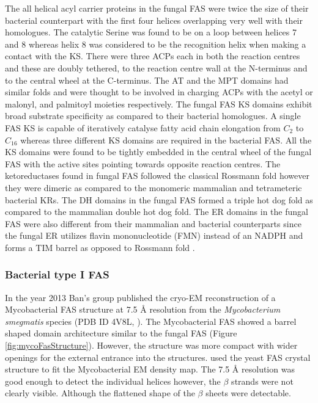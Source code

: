 		The all helical acyl carrier proteins in the fungal FAS were twice the size of their bacterial counterpart  with the first four helices overlapping very well with their homologues. The catalytic Serine was found to be on a loop between helices 7 and 8 whereas helix 8 was considered to be the recognition helix when making a contact with the KS. There were three ACPs each in both the reaction centres and these are doubly tethered, to the reaction centre wall at the N-terminus and to the central wheel at the C-terminus. The AT and the MPT domains had similar folds and were thought to be involved in charging ACPs with the acetyl or malonyl, and palmitoyl moieties respectively. The fungal FAS KS domains exhibit broad substrate specificity as compared to their bacterial homologues. A single FAS KS is capable of iteratively catalyse fatty acid chain elongation from $ C_{2} $ to $ C_{16} $ whereas three different KS domains are required in the bacterial FAS. All the KS domains were found to be tightly embedded in the central wheel of the fungal FAS with the active sites pointing towards opposite reaction centres. The ketoreductases found in fungal FAS followed the classical Rossmann fold however they were dimeric as compared to the monomeric mammalian and tetrameteric bacterial KRs. The DH domains in the fungal FAS formed a triple hot dog fold as compared to the mammalian double hot dog fold. The ER domains in the fungal FAS were also different from their mammalian and bacterial counterparts since the fungal ER utilizes flavin mononucleotide (FMN)  instead of an NADPH and forms a TIM barrel as opposed to Rossmann fold \parencite{Jenni2007, Leibundgut2007}.
		
		\subsubsection{Bacterial type I FAS}
		\label{sec:bFAS}
		In the year 2013 Ban's group published the cryo-EM reconstruction of a Mycobacterial FAS structure at 7.5 \AA{} resolution from the \textit{Mycobacterium smegmatis} species (PDB ID 4V8L, \textcite{Boehringer2013}). The Mycobacterial FAS showed a barrel shaped domain architecture similar to the fungal FAS (Figure \ref{fig:mycoFasStructure}). However, the structure was more compact with wider openings for the external entrance into the structures. \textcite{Boehringer2013} used the yeast FAS crystal structure to fit the Mycobacterial EM density map. The 7.5 \AA{} resolution was good enough to detect the individual helices however, the $ \beta $ strands were not clearly visible. Although the flattened shape of the $\beta$ sheets were detectable. 
		
